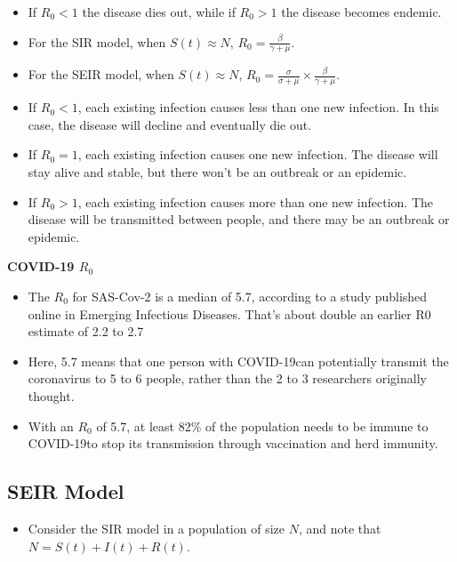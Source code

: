 \documentclass[]{book}
\providecommand{\tightlist}{%
  \setlength{\itemsep}{0pt}\setlength{\parskip}{0pt}}
\begin{document}
\begin{itemize}
\item
  If \(R_0 < 1\) the disease dies out, while if \(R_0 > 1\) the disease
  becomes endemic.
\item
  For the SIR model, when \(S(t) \approx N\),
  \(R_0 = \frac{\beta}{\gamma + \mu}\).
\item
  For the SEIR model, when \(S(t) \approx N\),
  \(R_0 = \frac{\sigma}{\sigma + \mu} \times \frac{\beta}{\gamma + \mu}\).
\item
  If \(R_0 < 1\), each existing infection causes less than one new
  infection. In this case, the disease will decline and eventually die
  out.
\item
  If \(R_0 = 1\), each existing infection causes one new infection. The
  disease will stay alive and stable, but there won't be an outbreak or
  an epidemic.
\item
  If \(R_0 > 1\), each existing infection causes more than one new
  infection. The disease will be transmitted between people, and there
  may be an outbreak or epidemic.
\end{itemize}

\textbf{COVID-19 \(R_0\)}

\begin{itemize}
\item
  The \(R_0\) for SAS-Cov-2 is a median of 5.7, according to a study
  published online in Emerging Infectious Diseases. That's about double
  an earlier R0 estimate of 2.2 to 2.7
\item
  Here, 5.7 means that one person with COVID-19can potentially transmit
  the coronavirus to 5 to 6 people, rather than the 2 to 3 researchers
  originally thought.
\item
  With an \(R_0\) of 5.7, at least 82\% of the population needs to be
  immune to COVID-19to stop its transmission through vaccination and
  herd immunity.
\end{itemize}

\subsection{SEIR Model}\label{seir-model}

\begin{itemize}
\tightlist
\item
  Consider the SIR model in a population of size \(N\), and note that
  \(N = S(t) + I(t) + R(t)\).
\end{itemize}
\end{document}
